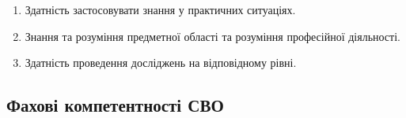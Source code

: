 \documentclass{Syllabus}
\begin{document}
\begin{enumerate}
    \item [ЗК 1:] Здатність застосовувати знання у практичних ситуаціях.
    \item [ЗК 2:] Знання та розуміння предметної області та розуміння професійної діяльності.
    \item [ЗК 6:] Здатність проведення досліджень на відповідному рівні.
\end{enumerate}

\subsection*{Фахові компетентності СВО}
\end{document}
